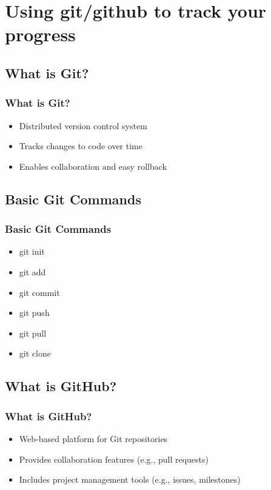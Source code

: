 \documentclass[9pt,table,xcolor=dvipsnames]{beamer}%
\theoremstyle{definition}
\theoremstyle{plain}
\begin{document}
\section{Using git/github to track your progress}
\subsection{What is Git?}
\begin{frame}
  \frametitle{What is Git?}
  \begin{itemize}
    \item Distributed version control system
    \item Tracks changes to code over time
    \item Enables collaboration and easy rollback
  \end{itemize}
\end{frame}
\subsection{Basic Git Commands}
\begin{frame}
  \frametitle{Basic Git Commands}
  \begin{itemize}
    \item git init
    \item git add
    \item git commit
    \item git push
    \item git pull
    \item git clone
  \end{itemize}
\end{frame}
\subsection{What is GitHub?}
\begin{frame}
  \frametitle{What is GitHub?}
  \begin{itemize}
    \item Web-based platform for Git repositories
    \item Provides collaboration features (e.g., pull requests)
    \item Includes project management tools (e.g., issues, milestones)
  \end{itemize}
\end{frame}
\end{document}
